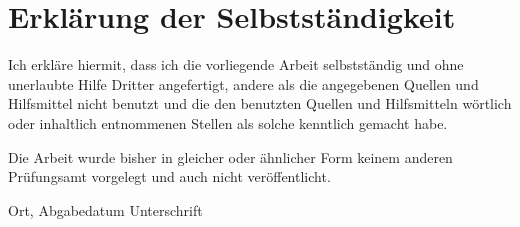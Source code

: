 \chapter*{Erkl\"arung der Selbstst\"andigkeit}
\thispagestyle{empty}

Ich erkl\"are hiermit, dass ich die vorliegende Arbeit selbstst\"andig
und ohne unerlaubte Hilfe Dritter angefertigt, andere als die angegebenen Quellen und
Hilfsmittel nicht benutzt und die den benutzten Quellen und Hilfsmitteln w\"ortlich
oder inhaltlich entnommenen Stellen als solche kenntlich gemacht habe.

\vspace{.5\baselineskip}
Die Arbeit wurde bisher in gleicher oder \"ahnlicher Form keinem anderen
Pr\"ufungsamt vorgelegt und auch nicht ver\"offentlicht.

\vspace{4\baselineskip}
\begin{center}
\parbox{.8\textwidth}{Ort, Abgabedatum \hfill Unterschrift}
\end{center}

\endinput
